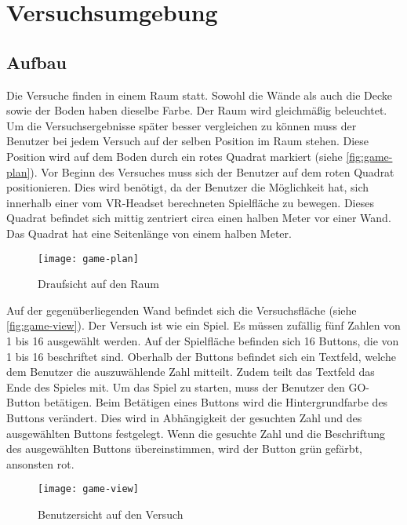 
\chapter{Versuchsumgebung}

\section{Aufbau}
Die Versuche finden in einem Raum statt. Sowohl die Wände als auch die Decke sowie der Boden haben dieselbe Farbe. Der Raum wird gleichmäßig beleuchtet. Um die Versuchsergebnisse später besser vergleichen zu können muss der Benutzer bei jedem Versuch auf der selben Position im Raum stehen. Diese Position wird auf dem Boden durch ein rotes Quadrat markiert (siehe \autoref{fig:game-plan}). Vor Beginn des Versuches muss sich der Benutzer auf dem roten Quadrat positionieren. Dies wird benötigt, da der Benutzer die Möglichkeit hat, sich innerhalb einer vom \ac{VR}-Headset berechneten Spielfläche zu bewegen. Dieses Quadrat befindet sich mittig zentriert circa einen halben Meter vor einer Wand. Das Quadrat hat eine Seitenlänge von einem halben Meter.

\begin{figure}[!htbp]
	\centering
	\texttt{[image: game-plan]}
	\caption[Draufsicht auf den Raum]{Draufsicht auf den Raum}
	\label{fig:game-plan}
\end{figure}

Auf der gegenüberliegenden Wand befindet sich die Versuchsfläche (siehe \autoref{fig:game-view}). Der Versuch ist wie ein Spiel. Es müssen zufällig fünf Zahlen von 1 bis 16 ausgewählt werden. Auf der Spielfläche befinden sich 16 Buttons, die von 1 bis 16 beschriftet sind. Oberhalb der Buttons befindet sich ein Textfeld, welche dem Benutzer die auszuwählende Zahl mitteilt. Zudem teilt das Textfeld das Ende des Spieles mit. Um das Spiel zu starten, muss der Benutzer den GO-Button betätigen. Beim Betätigen eines Buttons wird die Hintergrundfarbe des Buttons verändert. Dies wird in Abhängigkeit der gesuchten Zahl und des ausgewählten Buttons festgelegt. Wenn die gesuchte Zahl und die Beschriftung des ausgewählten Buttons übereinstimmen, wird der Button grün gefärbt, ansonsten rot.

\begin{figure}[!htbp]
\centering
\texttt{[image: game-view]}
\caption[Benutzersicht auf den Versuch]{Benutzersicht auf den Versuch}
\label{fig:game-view}
\end{figure}

